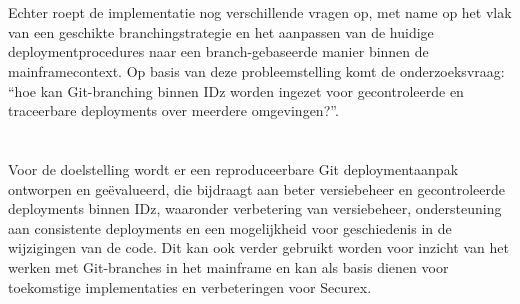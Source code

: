 
\section{}%
\label{sec:onderzoeksvraag}

 Echter roept de implementatie nog verschillende vragen op, met name op het vlak van een geschikte branchingstrategie en het aanpassen van de huidige deploymentprocedures naar een branch-gebaseerde manier binnen de mainframecontext. Op basis van deze probleemstelling komt de onderzoeksvraag: ``hoe kan Git-branching binnen IDz worden ingezet voor gecontroleerde en traceerbare deployments over meerdere omgevingen?''.


\section{}%
\label{sec:onderzoeksdoelstelling}


Voor de doelstelling wordt er een reproduceerbare Git deploymentaanpak ontworpen en geëvalueerd, die bijdraagt aan beter versiebeheer en gecontroleerde deployments binnen IDz, waaronder verbetering van versiebeheer, ondersteuning aan consistente deployments en een mogelijkheid voor geschiedenis in de wijzigingen van de code. Dit kan ook verder gebruikt worden voor inzicht van het werken met Git-branches in het mainframe en kan als basis dienen voor toekomstige implementaties en verbeteringen voor Securex.

